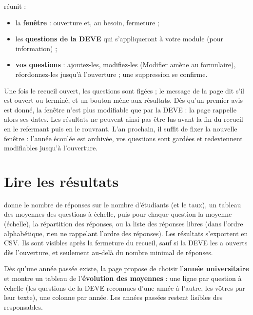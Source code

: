 \documentclass[11pt,a4paper]{article}
\begin{document}
 réunit :
\begin{itemize}
  \item la \textbf{fenêtre} : ouverture et, au besoin, fermeture ;
  \item les \textbf{questions de la DEVE} qui s'appliqueront à votre module (pour information) ;
  \item \textbf{vos questions} : ajoutez-les, modifiez-les (\og Modifier\fg{} amène au
    formulaire), réordonnez-les jusqu'à l'ouverture ; une suppression se confirme.
\end{itemize}
Une fois le recueil ouvert, les questions sont figées ; le message de la page dit s'il est
ouvert ou terminé, et un bouton mène aux résultats. Dès qu'un premier avis est donné, la fenêtre
n'est plus modifiable que par la DEVE : la page rappelle alors ses dates. Les résultats ne
peuvent ainsi pas être lus avant la fin du recueil en le refermant puis en le rouvrant. L'an prochain, il suffit de fixer
la nouvelle fenêtre : l'année écoulée est archivée, vos questions sont gardées et redeviennent
modifiables jusqu'à l'ouverture.


\section{Lire les résultats}

 donne le nombre de réponses sur le nombre d'étudiants (et le
taux), un tableau des moyennes des questions à échelle, puis pour chaque question la moyenne (échelle), la répartition des réponses, ou la liste des
réponses libres (dans l'ordre alphabétique, rien ne rappelant l'ordre des réponses). Les
résultats s'exportent en CSV. Ils sont visibles après la fermeture du recueil, sauf si la
DEVE les a ouverts dès l'ouverture, et seulement au-delà du nombre minimal de réponses.


Dès qu'une année passée existe, la page propose de choisir l'\textbf{année universitaire} et
montre un tableau de l'\textbf{évolution des moyennes} : une ligne par question à échelle (les
questions de la DEVE reconnues d'une année à l'autre, les vôtres par leur texte), une colonne
par année. Les années passées restent lisibles des responsables.
\end{document}
